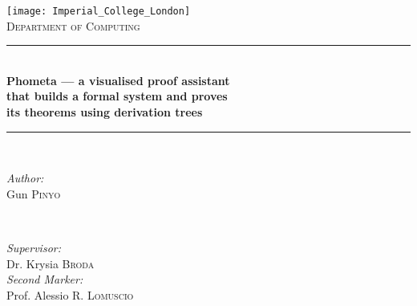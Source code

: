 \begin{titlepage}

\newcommand{\HRule}{\rule{\linewidth}{0.5mm}} %

\center %


\texttt{[image: Imperial\_College\_London]}\\[1cm] %

\textsc{\LARGE Department of Computing}\\[2cm] %


\HRule\ \\ [0.4cm]

{ \huge \bfseries Phometa --- a visualised proof assistant }\\[0.4cm] %
{ \huge \bfseries that builds a formal system and proves }\\[0.4cm] %
{ \huge \bfseries its theorems using derivation trees }\\[0.4cm] %

\HRule\ \\ [1.5cm]


\begin{minipage}{0.3\textwidth}
\begin{flushleft} \Large
\emph{Author:}\\
Gun \textsc{Pinyo} %
\end{flushleft}
\end{minipage}
~
\begin{minipage}{0.5\textwidth}
\begin{flushright} \Large
\emph{Supervisor:} \\
Dr. Krysia \textsc{Broda} \\ [0.5cm] %
\emph{Second Marker:} \\
Prof. Alessio \textsc{R. Lomuscio} \\ %
\end{flushright}
\end{minipage}\\[2cm]


\end{titlepage}
